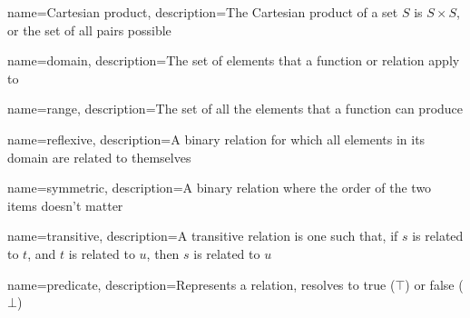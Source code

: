 {
    name={Cartesian product},
    description={The Cartesian product of a set $S$ is $S \times S$, or the set of all pairs possible}
}

{
    name={domain},
    description={The set of elements that a function or relation apply to}
}

{
    name={range},
    description={The set of all the elements that a function can produce}
}

{
    name={reflexive},
    description={A binary relation for which all elements in its domain are related to themselves}
}

{
    name={symmetric},
    description={A binary relation where the order of the two items doesn't matter}
}

{
    name={transitive},
    description={A transitive relation is one such that, if $s$ is related to $t$, and $t$ is related to $u$, then $s$ is related to $u$}
}

{
    name={predicate},
    description={Represents a relation, resolves to true ($\top$) or false ($\bot$)}
}
